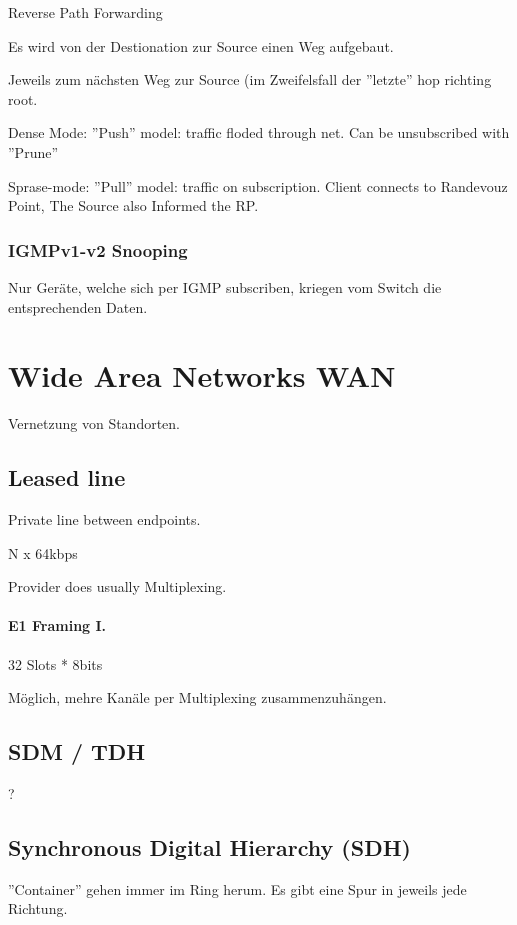 Reverse Path Forwarding

Es wird von der Destionation zur Source einen Weg aufgebaut.

Jeweils zum nächsten Weg zur Source (im Zweifelsfall der ''letzte'' hop richting root.

Dense Mode: ''Push'' model: traffic floded through net. Can be unsubscribed with ''Prune''

Sprase-mode: ''Pull'' model: traffic on subscription. Client connects to Randevouz Point, The Source also Informed the RP.

\subsubsection{IGMPv1-v2 Snooping}

Nur Geräte, welche sich per IGMP subscriben, kriegen vom Switch die entsprechenden Daten.



\section{Wide Area Networks WAN}

Vernetzung von Standorten.

\subsection{Leased line}

Private line between endpoints.

N x 64kbps

Provider does usually Multiplexing.

\paragraph{E1 Framing I.}

32 Slots * 8bits

Möglich, mehre Kanäle per Multiplexing zusammenzuhängen.

\subsection{SDM / TDH}?

\subsection{Synchronous Digital Hierarchy (SDH)}

''Container'' gehen immer im Ring herum. Es gibt eine Spur in jeweils jede Richtung.

